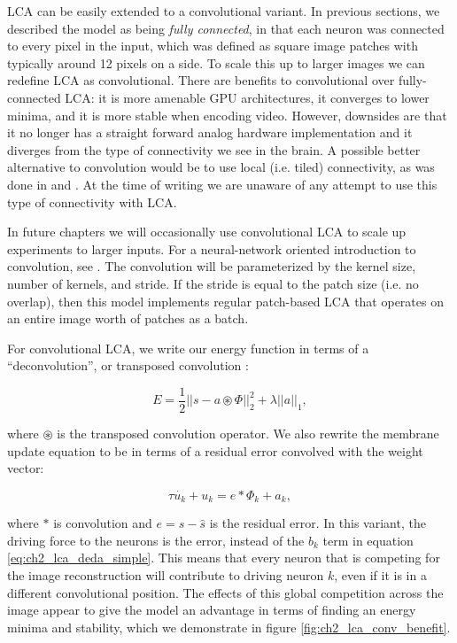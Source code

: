 LCA can be easily extended to a convolutional variant. In previous sections, we described the model as being \textit{fully connected}, in that each neuron was connected to every pixel in the input, which was defined as square image patches with typically around 12 pixels on a side. To scale this up to larger images we can redefine LCA as convolutional. There are benefits to convolutional over fully-connected LCA: it is more amenable GPU architectures, it converges to lower minima, and it is more stable when encoding video. However, downsides are that it no longer has a straight forward analog hardware implementation and it diverges from the type of connectivity we see in the brain. A possible better alternative to convolution would be to use local (i.e. tiled) connectivity, as was done in \parencite{le2011building} and \parencite{ngiam2010tiled}. At the time of writing we are unaware of any attempt to use this type of connectivity with LCA.

In future chapters we will occasionally use convolutional LCA to scale up experiments to larger inputs. For a neural-network oriented introduction to convolution, see \parencite{goodfellow2016deep}. The convolution will be parameterized by the kernel size, number of kernels, and stride. If the stride is equal to the patch size (i.e. no overlap), then this model implements regular patch-based LCA that operates on an entire image worth of patches as a batch.

For convolutional LCA, we write our energy function in terms of a ``deconvolution'', or transposed convolution \parencite{zeiler2010deconvolutional}:

\begin{equation}
    E = \frac{1}{2} || s - a \circledast \Phi ||^{2}_{2} + \lambda ||a||_{1},
\end{equation}

\noindent where $\circledast$ is the transposed convolution operator. We also rewrite the membrane update equation to be in terms of a residual error convolved with the weight vector:

\begin{equation}\label{eq:ch2_conv_lca_dynamics}
   \tau \dot{u_{k}} + u_{k} = e \ast \Phi_{k} + a_{k},
\end{equation}

\noindent where $\ast$ is convolution and $e = s - \hat{s}$ is the residual error. In this variant, the driving force to the neurons is the error, instead of the $b_{k}$ term in equation \ref{eq:ch2_lca_deda_simple}. This means that every neuron that is competing for the image reconstruction will contribute to driving neuron $k$, even if it is in a different convolutional position. The effects of this global competition across the image appear to give the model an advantage in terms of finding an energy minima and stability, which we demonstrate in figure \ref{fig:ch2_lca_conv_benefit}.

